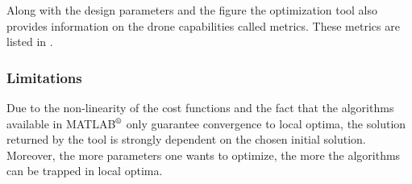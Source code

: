 Along with the design parameters and the figure the optimization tool also
provides information on the drone capabilities called metrics. These metrics are
listed in .

\begin{table}[!h]
\begin{center}
 \caption{List of the metrics returned by the optimization tool.}\vspace{1ex}
 \label{tab:tab_metrics}
\end{center}
\end{table}

\subsubsection{Limitations}
\label{sec:limitations}
Due to the non-linearity of the cost functions and the fact that the algorithms
available in MATLAB$^\textrm{\textregistered}$ only guarantee convergence
to local optima, the solution returned by the tool is strongly dependent on the
chosen initial solution. Moreover, the more parameters one wants to optimize, the
more the algorithms can be trapped in local optima.

